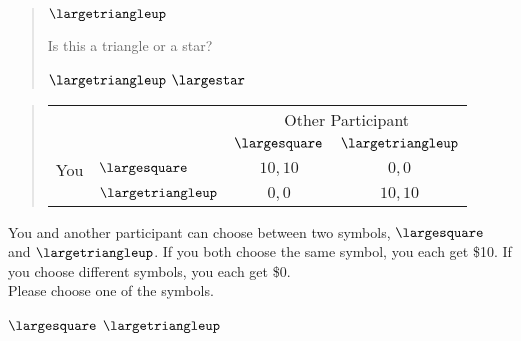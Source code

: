 \documentclass[11pt]{article}
\begin{document}
\begin{tcolorbox}
\begin{quote}
\begin{center}
{\Huge $\largetriangleup$}
\end{center}
 \centering Is this a triangle or a star?

 \begin{center}
$\largetriangleup$ \qquad $\largestar$
\end{center}
\end{quote}


\begin{quote}
\begin{center}
\begin{tabular}{llcc}
    & & \multicolumn{2}{c}{Other Participant}  \\
  &  & $\largesquare$ & $\largetriangleup$  \\ \cline{3-4}
You & $\largesquare$ & \multicolumn{1}{|c|}{$10,10$} & \multicolumn{1}{c|}{$0,0$}  \\ \cline{3-4}
& $\largetriangleup$ & \multicolumn{1}{|c|}{$0,0$} & \multicolumn{1}{c|}{$10,10$}  \\ \cline{3-4}
\end{tabular}
\end{center}
\end{quote}

You and another participant can choose between two symbols, $\largesquare$ and $\largetriangleup$. If you both choose the same symbol, you each get \$10. If you choose different symbols, you each get \$0.\\

Please choose one of the symbols.\\

\begin{center}
$\largesquare$ \qquad $\largetriangleup$
\end{center}
\end{tcolorbox}
\end{document}
